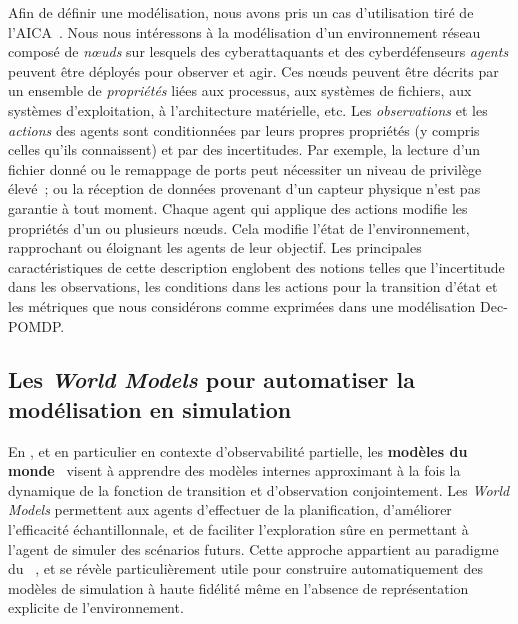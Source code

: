 \noindent
Afin de définir une modélisation, nous avons pris un cas d'utilisation tiré de l'AICA~\cite{theron_autonomous_2021}. Nous nous intéressons à la modélisation d'un environnement réseau composé de \textit{nœuds} sur lesquels des cyberattaquants et des cyberdéfenseurs \textit{agents} peuvent être déployés pour observer et agir. Ces nœuds peuvent être décrits par un ensemble de \textit{propriétés} liées aux processus, aux systèmes de fichiers, aux systèmes d'exploitation, à l'architecture matérielle, etc.
Les \textit{observations} et les \textit{actions} des agents sont conditionnées par leurs propres propriétés (y compris celles qu'ils connaissent) et par des incertitudes. Par exemple, la lecture d'un fichier donné ou le remappage de ports peut nécessiter un niveau de privilège élevé~; ou la réception de données provenant d'un capteur physique n'est pas garantie à tout moment.
Chaque agent qui applique des actions modifie les propriétés d'un ou plusieurs nœuds. Cela modifie l'état de l'environnement, rapprochant ou éloignant les agents de leur objectif.
Les principales caractéristiques de cette description englobent des notions telles que l'incertitude dans les observations, les conditions dans les actions pour la transition d'état et les métriques que nous considérons comme exprimées dans une modélisation Dec-POMDP.



\subsection{Les \textit{World Models} pour automatiser la modélisation en simulation}

En , et en particulier en contexte d'observabilité partielle, les \textbf{modèles du monde}~\cite{ha2018recurrent, hafner2020dream} visent à apprendre des modèles internes approximant à la fois la dynamique de la fonction de transition et d'observation conjointement. Les \textit{World Models} permettent aux agents d'effectuer de la planification, d'améliorer l'efficacité échantillonnale, et de faciliter l'exploration sûre en permettant à l'agent de simuler des scénarios futurs. Cette approche appartient au paradigme du ~\cite{moerland2020model}, et se révèle particulièrement utile pour construire automatiquement des modèles de simulation à haute fidélité même en l'absence de représentation explicite de l'environnement.


